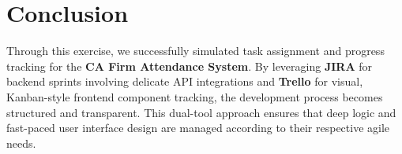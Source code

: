 \documentclass[12pt,a4paper]{article}
\begin{document}
\section{Conclusion}
Through this exercise, we successfully simulated task assignment and progress tracking for the \textbf{CA Firm Attendance System}. By leveraging \textbf{JIRA} for backend sprints involving delicate API integrations and \textbf{Trello} for visual, Kanban-style frontend component tracking, the development process becomes structured and transparent. This dual-tool approach ensures that deep logic and fast-paced user interface design are managed according to their respective agile needs.
\end{document}
